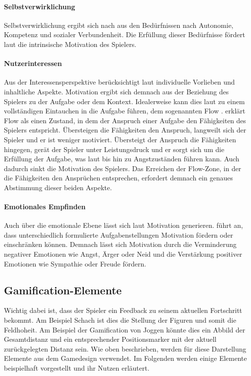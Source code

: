 \documentclass[
	oneside,  %
	ngerman, 
	final, 
	11pt, 
	a4paper, 
	1.1headlines, 
	headinclude=false, 
	footinclude=false, 
	mpinclude=false, 
	pagesize, 
	onecolumn, 
	titlepage, 
	parskip=half, 
	headsepline, 
	chapterprefix=false, 
	version=first, 
	listof=totoc, 
	bibliography=totoc, 
	toc=graduated, 
	fleqn
]{scrbook}
\begin{document}
\paragraph{Selbstverwirklichung}
Selbstverwirklichung ergibt sich nach \cite{SH2014} aus den Bedürfnissen nach Autonomie, Kompetenz und sozialer Verbundenheit.
Die Erfüllung dieser Bedürfnisse fördert laut \cite{SH2014} die intrinsische Motivation des Spielers.

\paragraph{Nutzerinteressen}
Aus der Interessensperspektive berücksichtigt laut \cite{SH2014} individuelle Vorlieben und inhaltliche Aspekte.
Motivation ergibt sich demnach aus der Beziehung des Spielers zu der Aufgabe oder dem Kontext.
Idealerweise kann dies laut \cite{SH2014} zu einem vollständigen Eintauchen in die Aufgabe führen, dem sogenannten \glqq Flow \grqq{}.
\cite{Zi2011} erklärt Flow als einen Zustand, in dem der Anspruch einer Aufgabe den Fähigkeiten des Spielers entspricht.
Übersteigen die Fähigkeiten den Anspruch, langweilt sich der Spieler und er ist weniger motiviert. Übersteigt der Anspruch die Fähigkeiten hingegen, gerät der Spieler unter Leistungsdruck und er sorgt sich um die Erfüllung der Aufgabe, was laut \cite{As2000} bis hin zu Angstzuständen führen kann.
Auch dadurch sinkt die Motivation des Spielers.
Das Erreichen der Flow-Zone, in der die Fähigkeiten den Ansprüchen entsprechen, erfordert demnach ein genaues Abstimmung dieser beiden Aspekte.

\paragraph{Emotionales Empfinden}
Auch über die emotionale Ebene lässt sich laut \cite{SH2014} Motivation generieren.
\cite{As2000} führt an, dass unterschiedlich formulierte Aufgabenstellungen Motivation fördern oder einschränken können.
Demnach lässt sich Motivation durch die Verminderung negativer Emotionen wie Angst, Ärger oder Neid und die Verstärkung positiver Emotionen wie Sympathie oder Freude fördern.

\subsection{Gamification-Elemente}
\label{Elemente}
Wichtig dabei ist, dass der Spieler ein Feedback zu seinem aktuellen Fortschritt bekommt.
Am Beispiel Schach ist dies die Stellung der Figuren und somit die Feldhoheit.
Am Beispiel der Gamification von Joggen könnte dies ein Abbild der Gesamtdistanz und ein entsprechender Positionsmarker mit der aktuell zurückgelegten Distanz sein.
Wie oben beschrieben, werden für diese Darstellung Elemente aus dem Gamedesign verwendet.
Im Folgenden werden einige Elemente beispielhaft vorgestellt und ihr Nutzen erläutert.
\end{document}
